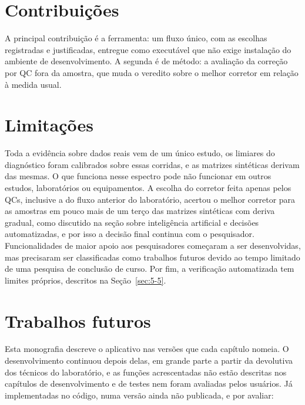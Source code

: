 \section{Contribuições}

A principal contribuição é a ferramenta: um fluxo único, com as escolhas registradas e justificadas, entregue como executável que não exige instalação do ambiente de desenvolvimento. A segunda é de método: a avaliação da correção por QC fora da amostra, que muda o veredito sobre o melhor corretor em relação à medida usual.

\section{Limitações}

Toda a evidência sobre dados reais vem de um único estudo, os limiares do diagnóstico foram calibrados sobre essas corridas, e as matrizes sintéticas derivam das mesmas. O que funciona nesse espectro pode não funcionar em outros estudos, laboratórios ou equipamentos. A escolha do corretor feita apenas pelos QCs, inclusive a do fluxo anterior do laboratório, acertou o melhor corretor para as amostras em pouco mais de um terço das matrizes sintéticas com deriva gradual, como discutido na seção sobre inteligência artificial e decisões automatizadas, e por isso a decisão final continua com o pesquisador. Funcionalidades de maior apoio aos pesquisadores começaram a ser desenvolvidas, mas precisaram ser classificadas como trabalhos futuros devido ao tempo limitado de uma pesquisa de conclusão de curso. Por fim, a verificação automatizada tem limites próprios, descritos na Seção~\ref{sec:5-5}.

\section{Trabalhos futuros}

Esta monografia descreve o aplicativo nas versões que cada capítulo nomeia. O desenvolvimento continuou depois delas, em grande parte a partir da devolutiva dos técnicos do laboratório, e as funções acrescentadas não estão descritas nos capítulos de desenvolvimento e de testes nem foram avaliadas pelos usuários. Já implementadas no código, numa versão ainda não publicada, e por avaliar:


